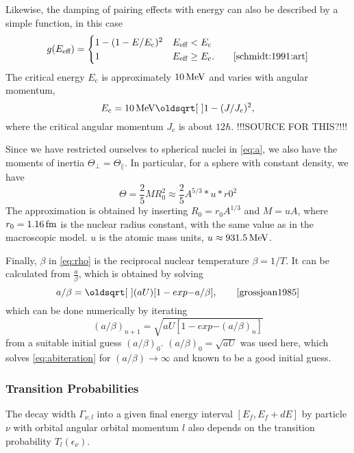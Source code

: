 Likewise, the damping of pairing effects with energy can also be described by a simple function, in this case
\begin{equation}
g(E_\text{eff}) = \begin{cases} 1-(1-E/E_\text{c})^2 & E_\text{eff} < E_\text{c} \\
 1 & E_\text{eff} \ge E_\text{c}.\qquad\cite{schmidt:1991:art}
\end{cases}
\end{equation}
The critical energy $E_\text{c}$ is approximately $\unit[10]{MeV}$ and varies with angular momentum, 
\begin{equation}
E_\text{c} = \unit[10]{MeV}\sqrt{1-(J/J_\text{c})^2},
\end{equation}
where the critical angular momentum $J_\text{c}$ is about $12\hbar$. !!!SOURCE FOR THIS?!!!

Since we have restricted ourselves to spherical nuclei in \eqref{eq:a}, we also have the moments of inertia $\Theta_\perp = \Theta_\parallel$. In particular, for a sphere with constant density, we have
\begin{equation}
\Theta = \frac{2}{5} M R_0^2 \approx \frac{2}{5} A^{5/3}*u*r0^2
\end{equation}
The approximation is obtained by inserting $R_0 = r_0 A^{1/3}$ and $M=u A$, where $r_0=\unit[1.16]{fm}$ is the nuclear radius constant, with the same value as in the macroscopic model\cite{moller1995}. $u$ is the atomic mass units, $u \approx \unit[931.5]{MeV}$.

Finally, $\beta$ in \eqref{eq:rho} is the reciprocal nuclear temperature $\beta=1/T$. It can be calculated from $\tfrac{a}{\beta}$, which is obtained by solving
\begin{equation}
a/\beta=\sqrt{(aU)[1 -exp{-a/\beta}]},\qquad\cite{grossjean1985}\label{eq:abiteration}
\end{equation}
which can be done numerically by iterating
\begin{equation}
(a/\beta)_{n+1}=\sqrt{aU[1 -exp{-(a/\beta)_n}]}
\end{equation}
from a suitable initial guess $(a/\beta)_{0}$. $(a/\beta)_{0}=\sqrt{aU}$ was used here, which solves \eqref{eq:abiteration} for $(a/\beta) \to \infty$ and known to be a good initial guess\cite{grossjean1985}.

\subsubsection{Transition Probabilities}
The decay width $\Gamma_{\nu,l}$ into a given final energy interval $[E_f,E_f+dE]$ by particle $\nu$ with orbital angular orbital momentum $l$ also depends on the transition probability $T_l(\epsilon_\nu)$.

